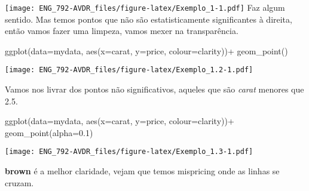 \documentclass[
]{book}
\newenvironment{Shaded}{\begin{snugshade}}{\end{snugshade}}
\newcommand{\AttributeTok}[1]{\textcolor[rgb]{0.77,0.63,0.00}{#1}}
\newcommand{\FloatTok}[1]{\textcolor[rgb]{0.00,0.00,0.81}{#1}}
\newcommand{\FunctionTok}[1]{\textcolor[rgb]{0.00,0.00,0.00}{#1}}
\newcommand{\NormalTok}[1]{#1}
\newcommand{\SpecialCharTok}[1]{\textcolor[rgb]{0.00,0.00,0.00}{#1}}
\begin{document}
\texttt{[image: ENG\_792-AVDR\_files/figure-latex/Exemplo\_1-1.pdf]}
Faz algum sentido. Mas temos pontos que não são estatisticamente significantes à direita, então vamos fazer uma limpeza, vamos mexer na transparência.

\begin{Shaded}
\begin{Highlighting}[]
\FunctionTok{ggplot}\NormalTok{(}\AttributeTok{data=}\NormalTok{mydata, }\FunctionTok{aes}\NormalTok{(}\AttributeTok{x=}\NormalTok{carat, }\AttributeTok{y=}\NormalTok{price, }\AttributeTok{colour=}\NormalTok{clarity))}\SpecialCharTok{+} 
  \FunctionTok{geom\_point}\NormalTok{()}
\end{Highlighting}
\end{Shaded}

\texttt{[image: ENG\_792-AVDR\_files/figure-latex/Exemplo\_1.2-1.pdf]}

Vamos nos livrar dos pontos não significativos, aqueles que são \emph{carat} menores que 2.5.

\begin{Shaded}
\begin{Highlighting}[]
\FunctionTok{ggplot}\NormalTok{(}\AttributeTok{data=}\NormalTok{mydata,}
       \FunctionTok{aes}\NormalTok{(}\AttributeTok{x=}\NormalTok{carat, }\AttributeTok{y=}\NormalTok{price, }\AttributeTok{colour=}\NormalTok{clarity))}\SpecialCharTok{+}
\FunctionTok{geom\_point}\NormalTok{(}\AttributeTok{alpha=}\FloatTok{0.1}\NormalTok{) }
\end{Highlighting}
\end{Shaded}

\texttt{[image: ENG\_792-AVDR\_files/figure-latex/Exemplo\_1.3-1.pdf]}

\textbf{brown} é a melhor claridade, vejam que temos mispricing onde as linhas se cruzam.

\begin{Shaded}
\end{Shaded}
\end{document}
